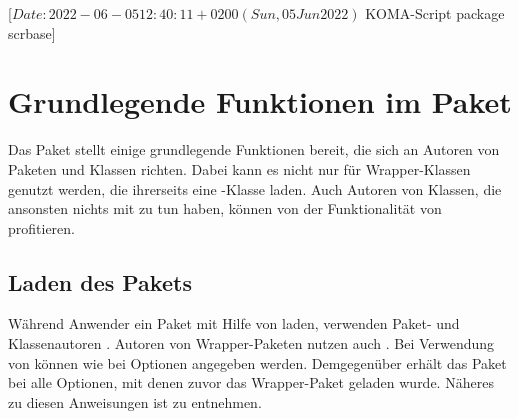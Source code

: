 %
%
%
%
%
%
%

                 [$Date: 2022-06-05 12:40:11 +0200 (Sun, 05 Jun 2022) $
                  KOMA-Script package scrbase]

\chapter{Grundlegende Funktionen im Paket }
\BeginIndexGroup
{}%

Das Paket  stellt einige grundlegende Funktionen bereit, die
sich an Autoren von Paketen und Klassen richten. Dabei kann es nicht nur für
Wrapper-Klassen genutzt werden, die ihrerseits eine \KOMAScript-Klasse
laden. Auch Autoren von Klassen, die ansonsten nichts mit \KOMAScript{} zu tun
haben, können von der Funktionalität von  profitieren.

\section{Laden des Pakets}

Während Anwender ein Paket mit Hilfe von  laden, verwenden
Paket- und Klassenautoren
. Autoren von Wrapper-Paketen
nutzen auch
. Bei
Verwendung von  können wie bei
 Optionen angegeben
werden. Demgegenüber erhält das Paket bei 
alle Optionen, mit denen zuvor das Wrapper-Paket geladen wurde. Näheres zu
diesen Anweisungen ist \cite{latex:clsguide} zu entnehmen.

